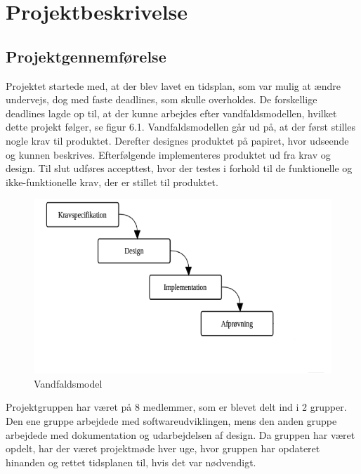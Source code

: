 \chapter{Projektbeskrivelse}

\section{Projektgennemførelse}
Projektet startede med, at der blev lavet en tidsplan, som var mulig at ændre undervejs, dog med faste deadlines, som skulle overholdes. De forskellige deadlines lagde op til, at der kunne arbejdes efter vandfaldsmodellen, hvilket dette projekt følger, se figur 6.1. Vandfaldsmodellen går ud på, at der først stilles nogle krav til produktet. Derefter designes produktet på papiret, hvor udseende og kunnen beskrives. Efterfølgende implementeres produktet ud fra krav og design. Til slut udføres accepttest, hvor der testes i forhold til de funktionelle og ikke-funktionelle krav, der er stillet til produktet.

\begin{figure}[H]
	\centering
	\includegraphics[width=1\textwidth]{Figurer/Snip20150522_15}
	\caption{Vandfaldsmodel}
\end{figure}

Projektgruppen har været på 8 medlemmer, som er blevet delt ind i 2 grupper. Den ene gruppe arbejdede med softwareudviklingen, mens den anden gruppe arbejdede med dokumentation og udarbejdelsen af design. Da gruppen har været opdelt, har der været projektmøde hver uge, hvor gruppen har opdateret hinanden og rettet tidsplanen til, hvis det var nødvendigt.


